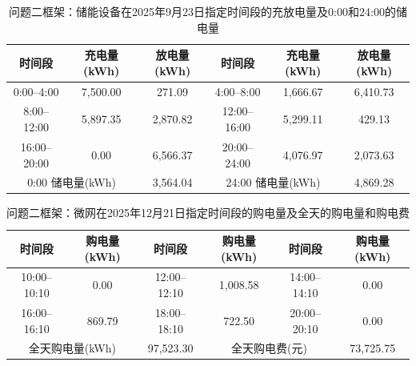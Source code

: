 \begin{table}[H]
  \centering
  \caption{问题二框架：储能设备在2025年9月23日指定时间段的充放电量及0:00和24:00的储电量}
  \label{tab:q4-2-storage-0923}
  \small
  \renewcommand{\arraystretch}{1.3}
  \begin{tabular}{|c|c|c|c|c|c|}
    \hline
    时间段 & 充电量(kWh) & 放电量(kWh) & 时间段 & 充电量(kWh) & 放电量(kWh) \\
    \hline
    0:00--4:00 & 7{,}500.00 & 271.09 & 4:00--8:00 & 1{,}666.67 & 6{,}410.73 \\
    \hline
    8:00--12:00 & 5{,}897.35 & 2{,}870.82 & 12:00--16:00 & 5{,}299.11 & 429.13 \\
    \hline
    16:00--20:00 & 0.00 & 6{,}566.37 & 20:00--24:00 & 4{,}076.97 & 2{,}073.63 \\
    \hline
    \multicolumn{2}{|c|}{0:00 储电量(kWh)} & \multicolumn{1}{c|}{3{,}564.04} & \multicolumn{2}{c|}{24:00 储电量(kWh)} & \multicolumn{1}{c|}{4{,}869.28} \\
    \hline
  \end{tabular}
\end{table}

\begin{table}[H]
  \centering
  \caption{问题二框架：微网在2025年12月21日指定时间段的购电量及全天的购电量和购电费}
  \label{tab:q4-2-purchase-1221}
  \small
  \renewcommand{\arraystretch}{1.3}
  \begin{tabular}{|c|c|c|c|c|c|}
    \hline
    时间段 & 购电量(kWh) & 时间段 & 购电量(kWh) & 时间段 & 购电量(kWh) \\
    \hline
    10:00--10:10 & 0.00 & 12:00--12:10 & 1{,}008.58 & 14:00--14:10 & 0.00 \\
    \hline
    16:00--16:10 & 869.79 & 18:00--18:10 & 722.50 & 20:00--20:10 & 0.00 \\
    \hline
    \multicolumn{2}{|c|}{全天购电量(kWh)} & \multicolumn{1}{c|}{97{,}523.30} & \multicolumn{2}{c|}{全天购电费(元)} & \multicolumn{1}{c|}{73{,}725.75} \\
    \hline
  \end{tabular}
\end{table}

